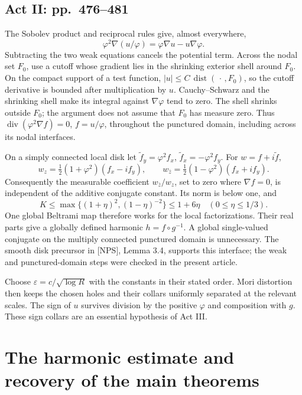 \documentclass[10pt]{article}
\begin{document}
\subsection*{Act II: pp. 476–481}
The Sobolev product and reciprocal rules give, almost everywhere, \[\varphi^2\nabla(u/\varphi)=\varphi\nabla u-u\nabla\varphi.\] Subtracting the two weak equations cancels the potential term. Across the nodal set \(F_0\), use a cutoff whose gradient lies in the shrinking exterior shell around \(F_0\). On the compact support of a test function, \(|u|\le C\,\operatorname{dist}(\,\cdot\,,F_0)\), so the cutoff derivative is bounded after multiplication by \(u\). Cauchy–Schwarz and the shrinking shell make its integral against \(\nabla\varphi\) tend to zero. The shell shrinks outside \(F_0\); the argument does not assume that \(F_0\) has measure zero. Thus \(\operatorname{div}(\varphi^2\nabla f)=0\), \(f=u/\varphi\), throughout the punctured domain, including across its nodal interfaces.\par
On a simply connected local disk let \(\widetilde f_y=\varphi^2 f_x\), \(\widetilde f_x=-\varphi^2 f_y\). For \(w=f+i\widetilde f\), \[w_z=\tfrac12(1+\varphi^2)(f_x-if_y),\qquad
 w_{\bar z}=\tfrac12(1-\varphi^2)(f_x+if_y).\] Consequently the measurable coefficient \(w_{\bar z}/w_z\), set to zero where \(\nabla f=0\), is independent of the additive conjugate constant. Its norm is below one, and \[K\le \max\{(1+\eta)^2,(1-\eta)^{-2}\}\le1+6\eta
 \quad (0\le\eta\le1/3).\] One global Beltrami map therefore works for the local factorizations. Their real parts give a globally defined harmonic \(h=f\circ g^{-1}\). A global single-valued conjugate on the multiply connected punctured domain is unnecessary. The smooth disk precursor in [NPS], Lemma 3.4, supports this interface; the weak and punctured-domain steps were checked in the present article.\par
Choose \(\varepsilon=c/\sqrt{\log R}\) with the constants in their stated order. Mori distortion then keeps the chosen holes and their collars uniformly separated at the relevant scales. The sign of \(u\) survives division by the positive \(\varphi\) and composition with \(g\). These sign collars are an essential hypothesis of Act III.\par
\section*{The harmonic estimate and recovery of the main theorems}
\end{document}
